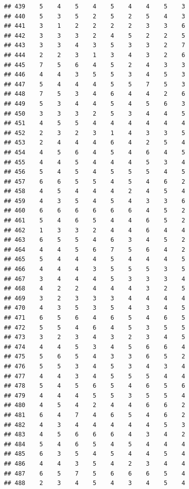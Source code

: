 \documentclass[
]{article}
\begin{document}
\begin{verbatim}
## 439    5    4    5    4    5    4    4    5    3
## 440    5    3    5    2    5    2    5    4    3
## 441    3    1    2    2    2    2    3    3    6
## 442    3    3    3    2    4    5    2    2    5
## 443    3    3    4    3    5    3    3    2    7
## 444    2    2    3    1    3    4    3    2    6
## 445    7    5    6    4    5    2    4    3    3
## 446    4    4    3    5    5    3    4    5    3
## 447    5    4    4    4    5    5    7    5    3
## 448    7    5    3    4    6    4    4    2    6
## 449    5    3    4    4    5    4    5    6    3
## 450    3    3    3    2    5    3    4    4    5
## 451    4    5    5    4    4    4    4    4    4
## 452    2    3    2    3    1    4    3    3    5
## 453    2    4    4    4    6    4    2    5    4
## 454    4    5    6    4    5    4    6    4    5
## 455    4    4    5    4    4    4    5    3    4
## 456    5    4    5    4    5    5    5    4    5
## 457    6    6    5    5    4    5    4    6    2
## 458    4    5    4    4    4    2    4    5    4
## 459    4    3    5    4    5    4    3    3    6
## 460    6    6    6    6    6    6    4    5    2
## 461    5    4    6    5    4    4    6    5    2
## 462    1    3    3    2    4    4    6    4    4
## 463    6    5    5    4    6    3    4    5    2
## 464    4    4    5    6    7    5    6    4    2
## 465    5    4    4    4    5    4    4    4    5
## 466    4    4    4    3    5    5    5    3    5
## 467    3    4    4    4    5    3    3    3    4
## 468    4    2    2    4    4    4    3    2    5
## 469    3    2    3    3    3    4    4    4    4
## 470    4    3    5    3    5    4    3    4    5
## 471    6    5    6    4    6    5    4    6    5
## 472    5    5    4    6    4    5    3    5    5
## 473    3    2    3    4    3    2    3    4    5
## 474    4    4    5    3    4    5    6    6    4
## 475    5    6    5    4    3    3    6    5    2
## 476    5    5    3    4    5    3    4    3    4
## 477    4    4    3    4    5    5    5    4    4
## 478    5    4    5    6    5    4    6    5    6
## 479    4    4    4    5    5    3    5    5    4
## 480    4    5    4    2    4    4    6    6    2
## 481    6    4    7    4    6    5    4    6    2
## 482    4    3    4    4    4    4    4    5    3
## 483    4    5    6    6    6    4    3    4    2
## 484    5    4    6    5    4    5    4    4    4
## 485    6    3    5    4    5    4    4    5    4
## 486    4    4    3    5    4    2    3    4    4
## 487    6    5    7    5    6    6    6    5    4
## 488    2    3    4    5    4    3    4    5    4

\end{verbatim}
\end{document}
